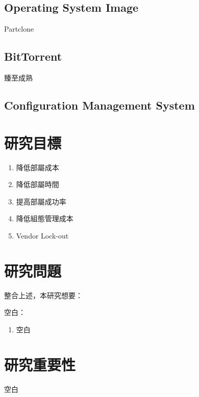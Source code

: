 \subsection{Operating System Image}
Partclone
\subsection{BitTorrent}
臻至成熟
\subsection{Configuration Management System}

\section{研究目標}
\begin{enumerate}
\item 降低部屬成本
\item 降低部屬時間
\item 提高部屬成功率
\item 降低組態管理成本
\item Vendor Lock-out
\end{enumerate}
\section{研究問題}
整合上述，本研究想要：

\noindent
空白：
\begin{enumerate}
\label{q1}
\item 空白
\end{enumerate}



\section{研究重要性} 
空白


